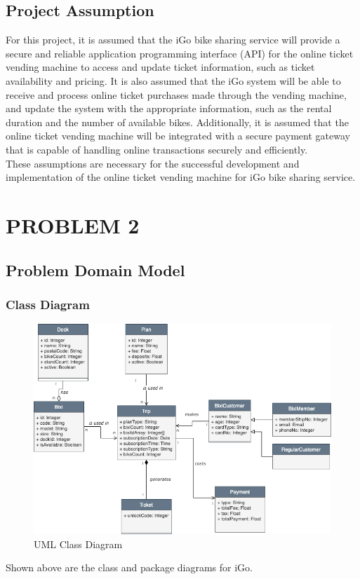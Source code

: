 \subsection{Project Assumption}
For this project, it is assumed that the iGo bike sharing service will provide a secure and reliable application programming interface (API) for the online ticket vending machine to access and update ticket information, such as ticket availability and pricing. It is also assumed that the iGo system will be able to receive and process online ticket purchases made through the vending machine, and update the system with the appropriate information, such as the rental duration and the number of available bikes. Additionally, it is assumed that the online ticket vending machine will be integrated with a secure payment gateway that is capable of handling online transactions securely and efficiently.\\
These assumptions are necessary for the successful development and implementation of the online ticket vending machine for iGo bike sharing service.


\section{PROBLEM 2}
\subsection{Problem Domain Model}
\subsubsection{Class Diagram}
\begin{figure}[H]
    \centering
    \includegraphics[scale=0.70]{images/ClassDiagram.png}
    \caption{UML Class Diagram}
\end{figure}
Shown above are the class and package diagrams for iGo.

